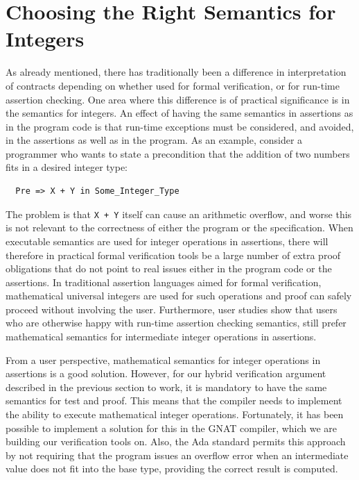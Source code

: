 \documentclass[sttt,final]{svjour}
\begin{document}
\section{Choosing the Right Semantics for Integers}
\label{overflowsemantics}
As already mentioned, there has traditionally been a difference in
interpretation of contracts depending on whether used for formal
verification, or for run-time assertion checking. One area where this
difference is of practical significance is in the semantics for
integers. An effect of having the same semantics in assertions as in
the program code is that run-time exceptions must be considered, and
avoided, in the assertions as well as in the program. As an example,
consider a programmer who wants to state a precondition that the
addition of two numbers fits in a desired integer type:
%
\begin{lstlisting}
  Pre => X + Y in Some_Integer_Type
\end{lstlisting}
%
The problem is that
\verb|X + Y| itself can cause an arithmetic overflow, and worse this
is not relevant to the correctness of either the program or the
specification. When executable semantics are used for integer
operations in assertions, there will therefore in practical formal
verification tools be a large number of extra proof obligations that do not
point to real issues either in the program code or the assertions. In
traditional assertion languages aimed for formal verification,
mathematical universal integers are used for such operations and proof
can safely proceed without involving the user. Furthermore, user
studies \cite{jotChalin04} show that users who are otherwise happy
with run-time assertion checking semantics, still prefer mathematical
semantics for intermediate integer operations in assertions.

From a user perspective, mathematical semantics for integer operations
in assertions is a good solution. However, for our hybrid verification
argument described in the previous section to work, it is mandatory to
have the same semantics for test and proof. This means that the
compiler needs to implement the ability to execute mathematical integer
operations. Fortunately, it has been possible to implement a solution
for this in the GNAT compiler, which we are building our verification
tools on. Also, the Ada standard permits this approach by not
requiring that the program issues an overflow error when an
intermediate value does not fit into the base type, providing the
correct result is computed.
\end{document}
